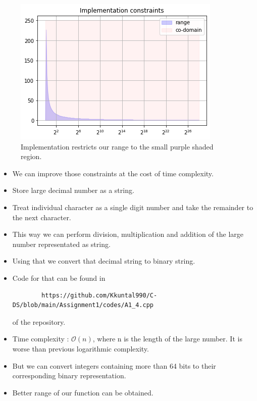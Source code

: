 \documentclass[journal,12pt,twocolumn]{IEEEtran}
\begin{document}
\begin{figure}[]
    \centering
    \includegraphics[scale=0.5]{images/constraints.png}
    \caption{Implementation restricts our range to the small purple shaded region.}
    \label{fig:constraints}
\end{figure}

\begin{itemize}
    \item We can improve those constraints at the cost of time complexity.
    \item Store large decimal number as a string.
    \item Treat individual character as a single digit number and take the remainder to the next character.
    \item This way we can perform division, multiplication and addition of the large number representated as string.
    \item Using that we convert that decimal string to binary string.
    \item Code for that can be found in \begin{lstlisting}
        https://github.com/Kkuntal990/C-DS/blob/main/Assignment1/codes/A1_4.cpp
    \end{lstlisting} of the repository.
    \item Time complexity : $\mathcal{O}(n)$, where n is the length of the large number. It is worse than previous logarithmic complexity.
    \item But we can convert integers containing more than 64 bits to their corresponding binary representation.
    \item Better range of our function can be obtained.
\end{itemize}
\end{document}
